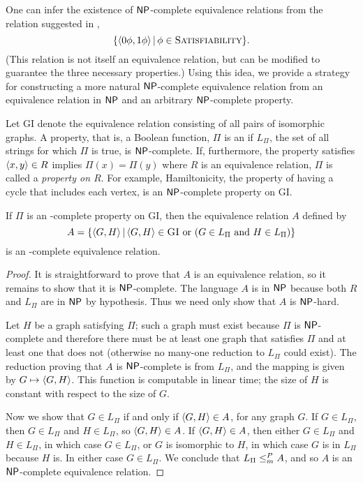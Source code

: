 One can infer the existence of ${\mathsf{NP}}$-complete equivalence relations from the relation suggested in \autocite[Section~6.2]{fg11},
\begin{equation*}
  \{\langle0\phi,1\phi\rangle \, | \, \phi \in \textsc{Satisfiability}\}.
\end{equation*}
(This relation is not itself an equivalence relation, but can be modified to guarantee the three necessary properties.)
Using this idea, we provide a strategy for constructing a more natural ${\mathsf{NP}}$-complete equivalence relation from an equivalence relation in ${\mathsf{NP}}$ and an arbitrary ${\mathsf{NP}}$-complete property.

Let \textsc{GI} denote the equivalence relation consisting of all pairs of isomorphic graphs.
A property, that is, a Boolean function, $\Pi$ is an  if $L_\Pi$, the set of all strings for which $\Pi$ is true, is ${\mathsf{NP}}$-complete.
If, furthermore, the property satisfies $\langle x,y\rangle \in R$ implies $\Pi(x) = \Pi(y)$ where $R$ is an equivalence relation, $\Pi$ is called a \emph{property on $R$}.
For example, Hamiltonicity, the property of having a cycle that includes each vertex, is an ${\mathsf{NP}}$-complete property on \textsc{GI}.

\begin{theorem}\label{thm:npceqrel}
  If $\Pi$ is an \NP-complete property on \textsc{GI}, then the equivalence relation $A$ defined by
  \begin{equation*}
    A = \left\{ \langle G,H\rangle \, \middle| \, \langle G,H\rangle \in \textsc{GI} \text{ or } (G \in L_\Pi \text{ and } H \in L_\Pi) \right\}
  \end{equation*}
  is an \NP-complete equivalence relation.
\end{theorem}
\begin{proof}
  It is straightforward to prove that $A$ is an equivalence relation, so it remains to show that it is ${\mathsf{NP}}$-complete.
  The language $A$ is in ${\mathsf{NP}}$ because both $R$ and $L_\Pi$ are in ${\mathsf{NP}}$ by hypothesis.
  Thus we need only show that $A$ is ${\mathsf{NP}}$-hard.

  Let $H$ be a graph satisfying $\Pi$; such a graph must exist because $\Pi$ is ${\mathsf{NP}}$-complete and therefore there must be at least one graph that satisfies $\Pi$ and at least one that does not (otherwise no many-one reduction to $L_\Pi$ could exist).
  The reduction proving that $A$ is ${\mathsf{NP}}$-complete is from $L_\Pi$, and the mapping is given by $G \mapsto \langle G,H\rangle$.
  This function is computable in linear time; the size of $H$ is constant with respect to the size of $G$.

  Now we show that $G \in L_\Pi$ if and only if $\langle G,H\rangle \in A$, for any graph $G$.
  If $G \in L_\Pi$, then $G \in L_\Pi$ and $H \in L_\Pi$, so $\langle G,H\rangle \in A$.
  If $\langle G,H\rangle \in A$, then either $G \in L_\Pi$ and $H \in L_\Pi$, in which case $G \in L_\Pi$, or $G$ is isomorphic to $H$, in which case $G$ is in $L_\Pi$ because $H$ is.
  In either case $G \in L_\Pi$.
  We conclude that $L_\Pi \leq^{P}_{m} A$, and so $A$ is an ${\mathsf{NP}}$-complete equivalence relation.
\end{proof}

